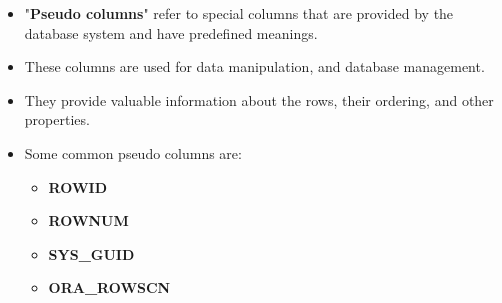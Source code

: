 \setlength{\columnsep}{3pt}
\begin{flushleft}
	
	\begin{itemize}
		\item "\textbf{Pseudo columns}" refer to special columns that are provided by the database system and have predefined meanings.
		\item These columns are used for data manipulation, and database management. 
		\item They provide valuable information about the rows, their ordering, and other properties. 
		\item Some common pseudo columns are:
		
		\begin{itemize}
			\item \textbf{ROWID}
			\item \textbf{ROWNUM}
			\item \textbf{SYS\_GUID}
			\item \textbf{ORA\_ROWSCN}
		\end{itemize}
		
		
	\end{itemize}
		
\end{flushleft}

\newpage

